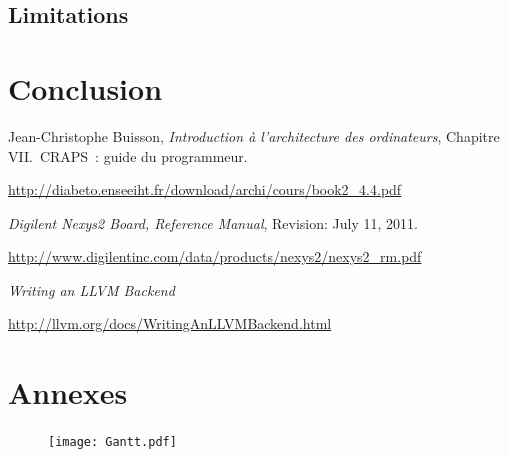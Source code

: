 \documentclass[openany, a4paper]{book}
\begin{document}
    \section{Limitations}

  \chapter{Conclusion}

  \begin{thebibliography}{9}
      Jean-Christophe Buisson,
      \emph{Introduction à l'architecture des ordinateurs},
      Chapitre VII.\ CRAPS~: guide du programmeur.

      \mbox{\url{http://diabeto.enseeiht.fr/download/archi/cours/book2_4.4.pdf}}

      \emph{Digilent Nexys2 Board, Reference Manual},
      Revision: July 11, 2011.

      \mbox{\url{http://www.digilentinc.com/data/products/nexys2/nexys2_rm.pdf}}

      \emph{Writing an LLVM Backend}

      \mbox{\url{http://llvm.org/docs/WritingAnLLVMBackend.html}}
  \end{thebibliography}

  \chapter*{Annexes}
    \thispagestyle{empty}
    \begin{figure}
      \centering
      \texttt{[image: Gantt.pdf]}
      \label{fig:gantt}
    \end{figure}
    \clearpage
    \restoregeometry
\end{document}
